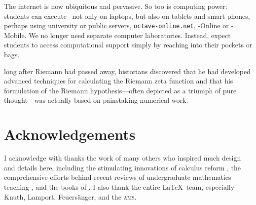 The internet is now ubiquitous and pervasive. 
So too is computing power: students can execute \script\ not only on laptops, but also on tablets and smart phones, perhaps using university or public servers, \verb|octave-online.net|, \script[1]-Online or \script[1]-Mobile. 
We no longer need separate computer laboratories.
Instead, expect students to access computational support simply by reaching into their pockets or bags.

\begin{quoted}{\cite{Donoho2015}}
long after Riemann had passed away, historians discovered that he had developed advanced techniques for calculating the Riemann zeta function and that his formulation of the Riemann hypothesis---often depicted as a triumph of pure thought---was actually based on painstaking numerical work.
\end{quoted}







\section*{Acknowledgements}

I acknowledge with thanks the work of many others who inspired much design and details here, including  the stimulating innovations of calculus reform \cite[e.g.]{HughesHallett2013},  the comprehensive efforts behind recent reviews of  undergraduate mathematics teaching \cite[e.g.]{Alpers2013, Bressoud2014, Turner2014, CUPMguide2015, gaimme2016}, and the books of \cite{Anton6, Davis99a, Holt2013, Larson2013, Lay2012, Nakos1998, Poole2015, Will04}.
I also thank the entire \LaTeX\ team, especially Knuth, Lamport, Feuers\"anger, and the \textsc{ams}.








